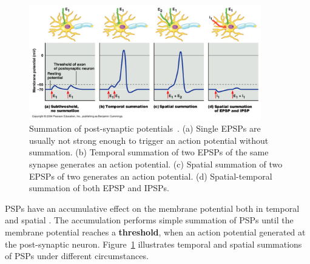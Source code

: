 


\begin{figure}[bt!]
	\centering
	\includegraphics[width=0.9\textwidth]{pics_snn/psp.png}
	\caption{Summation of post-synaptic potentials~\citep{reece2011campbell}. 
		(a) Single EPSPs are usually not strong enough to trigger an action potential without summation. (b) Temporal summation of two EPSPs of the same synapse generates an action potential. (c) Spatial summation of two EPSPs of two \DIFdelbeginFL {}\DIFdelendFL \DIFaddbeginFL {}\DIFaddendFL generates an action potential. (d) Spatial-temporal summation of both EPSP and IPSPs.
	}
	\label{Fig:psp_sum}
\end{figure}

\DIFdelbegin {}\DIFdelend \DIFaddbegin {}\DIFaddend PSPs have an accumulative effect on the membrane potential both in temporal and spatial \DIFaddbegin {}\DIFaddend .
The accumulation performs \DIFaddbegin {}\DIFaddend simple summation of PSPs until the membrane potential reaches a \textbf{threshold}, when an action potential \DIFdelbegin {}\DIFdelend \DIFaddbegin {}\DIFaddend generated at the post-synaptic neuron.
Figure~\ref{Fig:psp_sum} illustrates temporal and spatial summations of PSPs under different circumstances.
\DIFaddbegin {}\DIFaddend 

